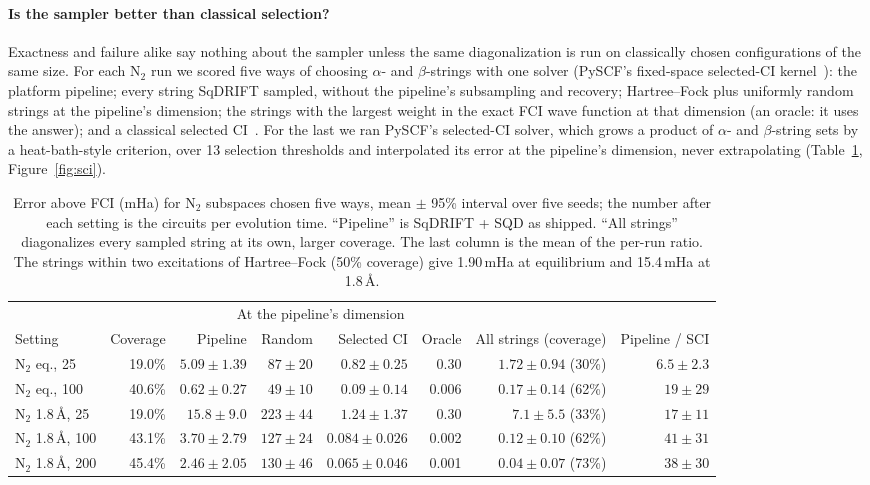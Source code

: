 \documentclass[11pt,a4paper]{article}
\begin{document}
\paragraph{Is the sampler better than classical selection?}
Exactness and failure alike say nothing about the sampler unless the same
diagonalization is run on classically chosen configurations of the same
size. For each N$_2$ run we scored five ways of choosing $\alpha$- and
$\beta$-strings with one solver (PySCF's fixed-space selected-CI
kernel~\cite{pyscf2020}): the platform pipeline; every string SqDRIFT
sampled, without the pipeline's subsampling and recovery; Hartree--Fock plus
uniformly random strings at the pipeline's dimension; the strings with the
largest weight in the exact FCI wave function at that dimension (an oracle:
it uses the answer); and a classical selected
CI~\cite{huron1973,holmes2016}. For the last we ran PySCF's selected-CI
solver, which grows a product of $\alpha$- and $\beta$-string sets by a
heat-bath-style criterion, over 13 selection thresholds and interpolated its
error at the pipeline's dimension, never extrapolating
(Table~\ref{tab:chemctl}, Figure~\ref{fig:sci}).

\begin{table}[H]
\centering\footnotesize\setlength{\tabcolsep}{3.5pt}
\begin{tabular}{lrrrrrrr}
\toprule
 & & \multicolumn{4}{c}{At the pipeline's dimension} & & \\
Setting & Coverage & Pipeline & Random & Selected CI & Oracle & All strings (coverage) & Pipeline / SCI \\
\midrule
N$_2$ eq., 25 & 19.0\% & $5.09 \pm 1.39$ & $87 \pm 20$ & $0.82 \pm 0.25$ & 0.30 & $1.72 \pm 0.94$ (30\%) & $6.5 \pm 2.3$ \\
N$_2$ eq., 100 & 40.6\% & $0.62 \pm 0.27$ & $49 \pm 10$ & $0.09 \pm 0.14$ & 0.006 & $0.17 \pm 0.14$ (62\%) & $19 \pm 29$ \\
N$_2$ 1.8\,\AA, 25 & 19.0\% & $15.8 \pm 9.0$ & $223 \pm 44$ & $1.24 \pm 1.37$ & 0.30 & $7.1 \pm 5.5$ (33\%) & $17 \pm 11$ \\
N$_2$ 1.8\,\AA, 100 & 43.1\% & $3.70 \pm 2.79$ & $127 \pm 24$ & $0.084 \pm 0.026$ & 0.002 & $0.12 \pm 0.10$ (62\%) & $41 \pm 31$ \\
N$_2$ 1.8\,\AA, 200 & 45.4\% & $2.46 \pm 2.05$ & $130 \pm 46$ & $0.065 \pm 0.046$ & 0.001 & $0.04 \pm 0.07$ (73\%) & $38 \pm 30$ \\
\bottomrule
\end{tabular}
\caption{Error above FCI (mHa) for N$_2$ subspaces chosen five ways, mean
$\pm$ 95\% interval over five seeds; the number after each setting is the
circuits per evolution time. ``Pipeline'' is SqDRIFT + SQD as shipped.
``All strings'' diagonalizes every sampled string at its own, larger
coverage. The last column is the mean of the per-run ratio. The strings
within two excitations of Hartree--Fock (50\% coverage) give 1.90\,mHa at
equilibrium and 15.4\,mHa at 1.8\,\AA.}
\label{tab:chemctl}
\end{table}
\end{document}
